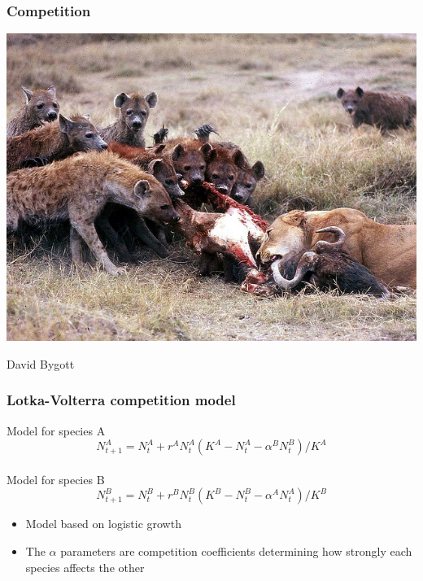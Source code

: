 \documentclass[color=usenames,dvipsnames]{beamer}\usepackage[]{graphicx}\usepackage[]{color}
\begin{document}
\begin{frame}
  \frametitle{Competition}
  \begin{center}
    \includegraphics[width=.95\textwidth]{figs/Hyena_lion} \par
    \vspace{-0.5cm} \hspace{.75\textwidth}
    {\tiny David Bygott \par}
  \end{center}
\end{frame}




\begin{frame}
  \frametitle{Lotka-Volterra competition model}
  \Large
  Model for species A
  \[
    N^A_{t+1} = N^A_t + r^A N^A_t(K^A - N^A_t - \alpha^B N^B_t) / K^A
  \] \\
  \vfill %
  \pause
  Model for species B
  \[
    N^B_{t+1} = N^B_t + r^B N^B_t(K^B - N^B_t - \alpha^A N^A_t) / K^B
  \]
  \pause
  \vfill
  \normalsize
  \begin{itemize}
  \item Model based on logistic growth
  \item The $\alpha$ parameters are competition coefficients
    determining how strongly each species affects the other
  \end{itemize}
\end{frame}
\end{document}
